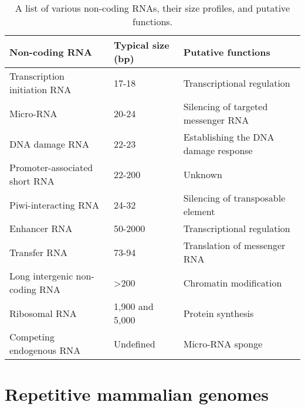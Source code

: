 \begin{table}[h]
   \footnotesize
   \begin{tabular}{p{3cm} l p{5cm}}
\textbf{Non-coding RNA}                       & \textbf{Typical size (bp)} & \textbf{Putative functions}              \\ \hline
Transcription initiation RNA                  & 17-18                      & Transcriptional regulation               \\ \hline
Micro-RNA                                     & 20-24                      & Silencing of targeted messenger RNA      \\ \hline
DNA damage RNA                                & 22-23                      & Establishing the DNA damage response     \\ \hline
Promoter-associated short RNA                 & 22-200                     & Unknown                                  \\ \hline
Piwi-interacting RNA                          & 24-32                      & Silencing of transposable element        \\ \hline
Enhancer RNA                                  & 50-2000                    & Transcriptional regulation               \\ \hline
Transfer RNA                                  & 73-94                      & Translation of messenger RNA             \\ \hline
Long intergenic non-coding RNA                & \textgreater200            & Chromatin modification                   \\ \hline
Ribosomal RNA                                 & 1,900 and 5,000            & Protein synthesis                        \\ \hline
Competing endogenous RNA                      & Undefined                  & Micro-RNA sponge                         \\ \hline
   \end{tabular}
   \caption[Table of non-coding RNAs]{A list of various non-coding RNAs, their size profiles, and putative functions.}
   \label{table:ncRNAs}
\end{table}

\section{Repetitive mammalian genomes}

